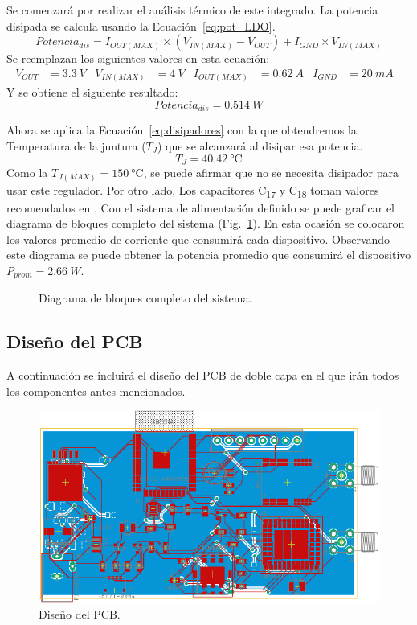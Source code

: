 Se comenzará por realizar el análisis térmico de este integrado. La potencia disipada se calcula usando la Ecuación~\ref{eq:pot_LDO}.
\begin{equation}
    Potencia_{dis}=I_{OUT(MAX)}\times(V_{IN(MAX)}-V_{OUT})+I_{GND}\times V_{IN(MAX)} \label{eq:pot_LDO}
\end{equation}
Se reemplazan los siguientes valores en esta ecuación:
\begin{align*}
    V_{OUT}&=\SI{3.3}{V}&
    V_{IN(MAX)}&=\SI{4}{V}&
    I_{OUT(MAX)}&=\SI{0.62}{A}&
    I_{GND}&=\SI{20}{mA}&
\end{align*}
Y se obtiene el siguiente resultado:
$$ Potencia_{dis}=\SI{0.514}{W}$$

Ahora se aplica la Ecuación~\ref{eq:disipadores} con la que obtendremos la Temperatura de la juntura ($T_J$) que se alcanzará al disipar esa potencia.
$$ T_J=\SI{40.42}{\celsius}$$
Como la $T_{J(MAX)}=\SI{150}{\celsius}$, se puede afirmar que no se necesita disipador para usar este regulador. Por otro lado, Los capacitores C\textsubscript{17} y C\textsubscript{18} toman valores recomendados en \cite{LT1764A}. Con el sistema de alimentación definido se puede graficar el diagrama de bloques completo del sistema (Fig.~\ref{fig:Bloques_comp}). En esta ocasión se colocaron los valores promedio de corriente que consumirá cada dispositivo. Observando este diagrama se puede obtener la potencia promedio que consumirá el dispositivo $P_{prom}=\SI{2.66}{W}$.

\begin{figure}[hbtp!]
\centering
{}%
\caption{Diagrama de bloques completo del sistema.}
\label{fig:Bloques_comp}
\end{figure}


\subsection{Diseño del PCB}
A continuación se incluirá el diseño del PCB de doble capa en el que irán todos los componentes antes mencionados.

\begin{figure}[hbtp!]
\centering
\includegraphics[width=\textwidth]{Board.pdf}
\caption{Diseño del PCB.}
\label{fig:Board}
\end{figure}
